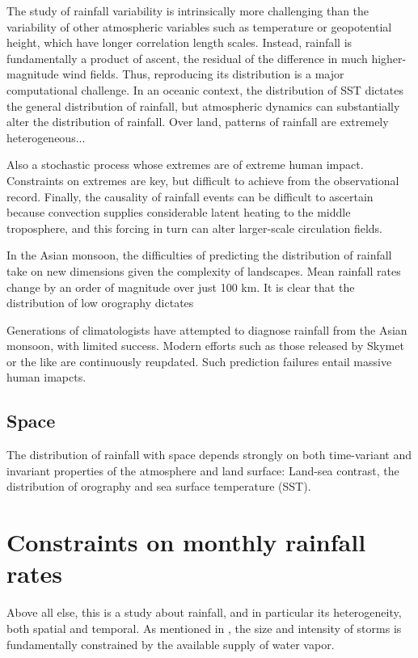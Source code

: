 The study of rainfall variability is intrinsically more challenging than the variability of other atmospheric variables such as temperature or geopotential height, which have longer correlation length scales. Instead, rainfall is fundamentally a product of ascent, the residual of the difference in much higher-magnitude wind fields. Thus, reproducing its distribution is a major computational challenge. In an oceanic context, the distribution of SST dictates the general distribution of rainfall, but atmospheric dynamics can substantially alter the distribution of rainfall. Over land, patterns of rainfall are extremely heterogeneous...

Also a stochastic process whose extremes are of extreme human impact. Constraints on extremes are key, but difficult to achieve from the observational record. Finally, the causality of rainfall events can be difficult to ascertain because convection supplies considerable latent heating to the middle troposphere, and this forcing in turn can alter larger-scale circulation fields.

In the Asian monsoon, the difficulties of predicting the distribution of rainfall take on new dimensions given the complexity of landscapes. Mean rainfall rates change by an order of magnitude over just 100 km. It is clear that the distribution of low orography dictates 

Generations of climatologists have attempted to diagnose rainfall from the Asian monsoon, with limited success. Modern efforts such as those released by Skymet or the like are continuously reupdated. Such prediction failures entail massive human imapcts.


\subsection{Space}
The distribution of rainfall with space depends strongly on both time-variant and invariant properties of the atmosphere and land surface: Land-sea contrast, the distribution of orography and sea surface temperature (SST).

\section{Constraints on monthly rainfall rates}
Above all else, this is a study about rainfall, and in particular its heterogeneity, both spatial and temporal. As mentioned in \cite{Trenberth}, the size and intensity of storms is fundamentally constrained by the available supply of water vapor.

